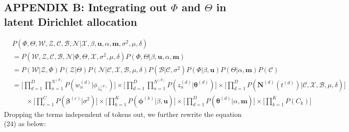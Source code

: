 \documentclass[a4paper]{article}
\begin{document}
  \subsection*{APPENDIX B: Integrating out $\Phi$ and $\Theta$ in latent Dirichlet allocation}
  \begin{equation}
  \begin{aligned}
   & P(\Phi, \Theta, \mathcal{W}, \mathcal{Z}, \mathcal{C}, \mathcal{B}, \mathcal{N}| \mathcal{X}, \beta, \boldsymbol{u}, \alpha, \boldsymbol{m}, \sigma^2, \mu, \delta) \\& 
   =  P(\mathcal{W}, \mathcal{Z}, \mathcal{C}, \mathcal{B}, \mathcal{N}| \Phi, \Theta, \mathcal{X}, \sigma^2, \mu, \delta) P(\Phi, \Theta |\beta, \boldsymbol{u}, \alpha, \boldsymbol{m})
   \\&= P( \mathcal{W}| \mathcal{Z}, \Phi)P(\mathcal{Z}|\Theta)P(\mathcal{N}|\mathcal{C}, \mathcal{X}, \mathcal{B}, \mu, \delta)P(\mathcal{B}|\mathcal{C}, \sigma^2)P(\Phi|\beta, \boldsymbol{u})P(\Theta|\alpha, \boldsymbol{m})P(\mathcal{C})
  \\&= \Big[\prod_{d=1}^{D}\prod_{n=1}^{N^{(d)}} P(w_n^{(d)}| \phi_{z_n^{(d)}})\Big]\times \Big[\prod_{d=1}^{D}\prod_{n=1}^{N^{(d)}} P( z_n^{(d)}| \boldsymbol{\theta}^{(d)})\Big]\times \Big[\prod_{d=1}^{D} P( \boldsymbol{N}^{(d)}(t^{(d)})|\mathcal{C}, \mathcal{X}, \mathcal{B}, \mu, \delta)\Big]  \\&\quad \quad \times\Big[\prod_{c=1}^{C} P( \boldsymbol{\beta}^{(c)}| \sigma^2)\Big]\times\Big[\prod_{k=1}^{K} P( \boldsymbol{\phi}^{(k)}| \beta, \boldsymbol{u})\Big]\times \Big[\prod_{d=1}^{D} P( \boldsymbol{\theta}^{(d)}|\alpha, \boldsymbol{m})\Big]\times \Big[\prod_{k=1}^{K} P(C_k)\Big]
  \end{aligned}
  \end{equation}
  Dropping the terms independent of tokens out, we further rewrite the equation (24) as below:
\end{document}
